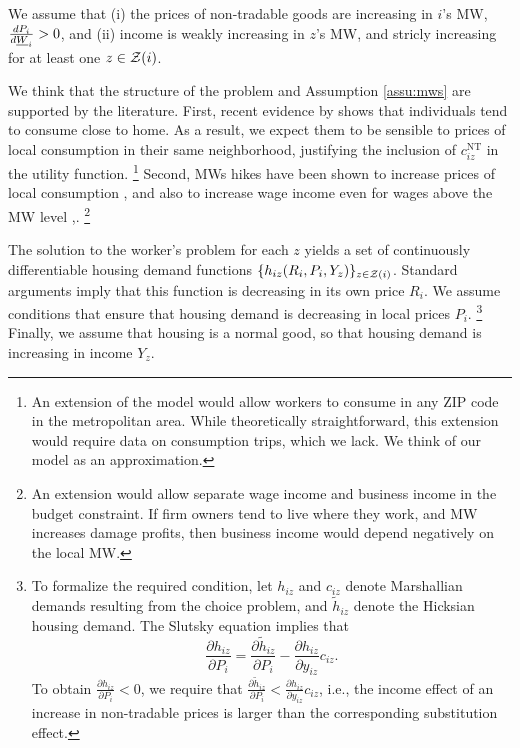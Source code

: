 \begin{assu}\label{assu:mws}
    We assume that
    (i) the prices of non-tradable goods are increasing in $i$'s MW, 
    $\frac{d P_i}{d \underline{W}_i} > 0$, and
    (ii) income is weakly increasing in $z$'s MW, and stricly increasing for at 
    least one $z\in\mathcal{Z}(i)$.
\end{assu}

We think that the structure of the problem and
Assumption \ref{assu:mws} are supported by the literature.
First, recent evidence by \textcite{MiyauchiEtAl2021} shows that individuals tend 
to consume close to home.
As a result, we expect them to be sensible to prices of local consumption in their 
same neighborhood, justifying the inclusion of $c^{\text{NT}}_{iz}$ in the utility
function.%
\footnote{An extension of the model would allow workers to consume in any ZIP code
in the metropolitan area.
While theoretically straightforward, this extension would require data on consumption
trips, which we lack.
We think of our model as an approximation.}
Second, MWs hikes have been shown to increase prices of local consumption 
\parencite[e.g.,][]{AllegrettoReich2018, Leung2021},
and also to increase wage income even for wages above the MW 
level \parencite[e.g.,][]{CegnizEtAl2019},.%
\footnote{An extension would allow separate wage income and business income in 
the budget constraint.
If firm owners tend to live where they work, and MW increases damage profits,
then business income would depend negatively on the local MW.}

The solution to the worker's problem for each $z$ yields a set of continuously 
differentiable housing demand functions $\{h_{iz} (R_i, P_i, Y_z)\}_{z\in\mathcal{Z}(i)}$.
Standard arguments imply that this function is decreasing in its own price $R_i$.
We assume conditions that ensure that housing demand is decreasing in local 
prices $P_i$.%
\footnote{To formalize the required condition, let $h_{iz}$ and $c_{iz}$ denote 
Marshallian demands resulting from the choice problem, and $\tilde h_{iz}$ 
denote the Hicksian housing demand.
The Slutsky equation implies that
$$\frac{\partial h_{iz}}{\partial P_i} 
   = \frac{\partial \tilde h_{iz}}{\partial P_i} 
   - \frac{\partial h_{iz}}{\partial y_{iz}} c_{iz}.$$
To obtain $\frac{\partial h_{iz}}{\partial P_i} < 0$, we require that 
$\frac{\partial \tilde h_{iz}}{\partial P_i} 
< \frac{\partial h_{iz}}{\partial y_{iz}} c_{iz}$, i.e., the income effect of an 
increase in non-tradable prices is larger than the corresponding substitution 
effect.}
Finally, we assume that housing is a normal good, so that housing demand is 
increasing in income $Y_z$.

